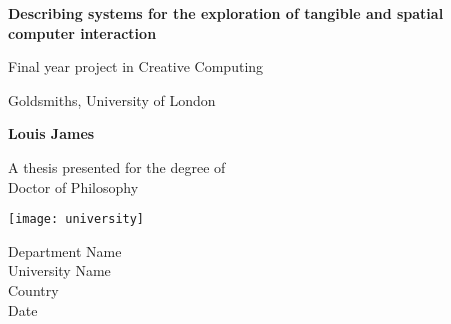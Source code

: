 \begin{titlepage}
   \begin{center}
       \vspace*{1cm}
       \begin{LARGE}
       \textbf{Describing systems for the exploration of tangible and spatial computer interaction}

  
       \end{LARGE}
       \vspace{0.5cm}
        
       \begin{Large}
        Final year project in Creative Computing \\

       \end{Large}
       \vspace{0.5cm}

       \begin{large}
        Goldsmiths, University of London 
       \end{large}
            
       \vspace{1.5cm}

       \textbf{Louis James}

       \vfill
            
       A thesis presented for the degree of\\
       Doctor of Philosophy
            
       \vspace{0.8cm}
     
       \texttt{[image: university]}
            
       Department Name\\
       University Name\\
       Country\\
       Date
            
   \end{center}
\end{titlepage}
